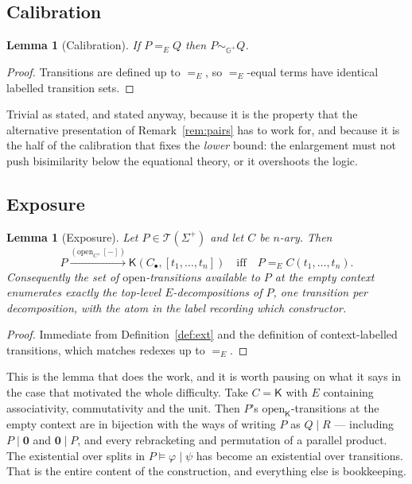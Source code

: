 \documentclass[11pt]{article}
\theoremstyle{plain}
\newtheorem{lemma}[theorem]{Lemma}
\theoremstyle{definition}
\newcommand{\Kc}{\mathsf{K}}
\newcommand{\Gg}{\mathbb{G}}
\newcommand{\op}{\mathrm{open}}
\newcommand{\bis}{\sim}
\newcommand{\Terms}{\mathcal{T}}
\begin{document}
\subsection{Calibration}
\label{sec:calibration}

\begin{lemma}[Calibration]
\label{lem:calib}
If $P =_E Q$ then $P \bis_{\Gg^+} Q$.
\end{lemma}

\begin{proof}
Transitions are defined up to $=_E$, so $=_E$-equal terms have identical labelled transition sets.
\end{proof}

Trivial as stated, and stated anyway, because it is the property that the alternative presentation of
Remark~\ref{rem:pairs} has to work for, and because it is the half of the calibration that fixes the
\emph{lower} bound: the enlargement must not push bisimilarity below the equational theory, or it
overshoots the logic.

\subsection{Exposure}

\begin{lemma}[Exposure]
\label{lem:exposure}
Let $P \in \Terms(\Sigma^+)$ and let $C$ be $n$-ary. Then
\[
P \xrightarrow{(\op_C,\, [-])} \Kc(C_\bullet, [t_1,\dots,t_n])
\quad\text{iff}\quad
P =_E C(t_1,\dots,t_n).
\]
Consequently the set of $\op$-transitions available to $P$ at the empty context enumerates exactly the
top-level $E$-decompositions of $P$, one transition per decomposition, with the atom in the label
recording which constructor.
\end{lemma}

\begin{proof}
Immediate from Definition~\ref{def:ext} and the definition of context-labelled transitions, which
matches redexes up to $=_E$.
\end{proof}

This is the lemma that does the work, and it is worth pausing on what it says in the case that
motivated the whole difficulty. Take $C = \Kc$ with $E$ containing associativity, commutativity and
the unit. Then $P$'s $\op_\Kc$-transitions at the empty context are in bijection with the ways of
writing $P$ as $Q \mid R$ --- including $P \mid \mathbf{0}$ and $\mathbf{0} \mid P$, and every
rebracketing and permutation of a parallel product. The existential over splits in
$P \models \varphi \mid \psi$ has become an existential over transitions. That is the entire content of
the construction, and everything else is bookkeeping.
\end{document}
